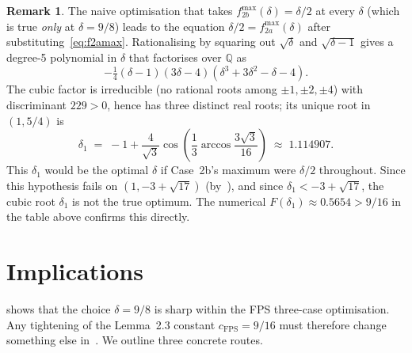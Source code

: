 \documentclass[11pt,a4paper]{article}
\theoremstyle{definition}
\newtheorem{remark}[theorem]{Remark}
\newcommand{\cFPS}{c_{\mathrm{FPS}}}
\newcommand{\QQ}{\mathbb{Q}}
\begin{document}
\begin{remark}\label{rem:cubic}
The naive optimisation that takes
$f_{2b}^{\max}(\delta) = \delta/2$ at every $\delta$ (which is true
\emph{only} at $\delta = 9/8$) leads to the equation
$\delta/2 = f_{2a}^{\max}(\delta)$ after substituting~\eqref{eq:f2amax}.
Rationalising by squaring out $\sqrt{\delta}$ and $\sqrt{\delta - 1}$
gives a degree-5 polynomial in $\delta$ that factorises over $\QQ$
as
\begin{equation}\label{eq:cubic-factor}
   -\tfrac{1}{4}(\delta - 1)(3\delta - 4)(\delta^3 + 3\delta^2 - \delta - 4).
\end{equation}
The cubic factor is irreducible (no rational roots among
$\pm 1, \pm 2, \pm 4$) with discriminant $229 > 0$, hence has three
distinct real roots; its unique root in $(1, 5/4)$ is
\[
   \delta_1 \;=\; -1 + \frac{4}{\sqrt 3}
                  \cos\!\left(\frac{1}{3}\arccos\frac{3\sqrt 3}{16}\right)
   \;\approx\; 1.114907.
\]
This $\delta_1$ would be the optimal $\delta$ if Case~2b's maximum
were $\delta/2$ throughout. Since this hypothesis fails on
$(1, -3 + \sqrt{17})$ (by~), and since
$\delta_1 < -3 + \sqrt{17}$, the cubic root $\delta_1$ is not the
true optimum. The numerical $F(\delta_1) \approx 0.5654 > 9/16$
in the table above confirms this directly.
\end{remark}

\section{Implications}\label{sec:implications}

 shows that the choice $\delta = 9/8$ is sharp
within the FPS three-case optimisation. Any tightening of the
Lemma~2.3 constant $\cFPS = 9/16$ must therefore change something
else in~\cite{FPS}. We outline three concrete routes.
\end{document}
